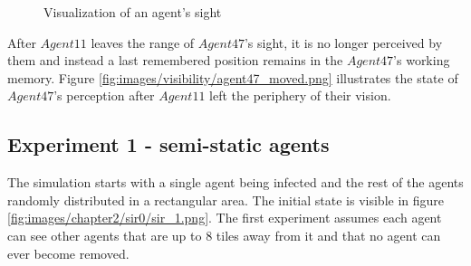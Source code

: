 \begin{figure}[H]
    \centering
    \hspace*{\fill}

    \caption{Visualization of an agent's sight}
\end{figure}

After $Agent11$ leaves the range of $Agent47$'s sight, it is no longer perceived by them and instead a last remembered position remains in the $Agent47$'s working memory.
Figure \ref{fig:images/visibility/agent47_moved.png} illustrates the state of $Agent47$'s perception after $Agent11$ left the periphery of their vision.

\subsection{Experiment 1 - semi-static agents}

The simulation starts with a single agent being infected and the rest of the agents randomly distributed in a rectangular area.
The initial state is visible in figure \ref{fig:images/chapter2/sir0/sir_1.png}.
The first experiment assumes each agent can see other agents that are up to 8 tiles away from it and that no agent can ever become removed.

